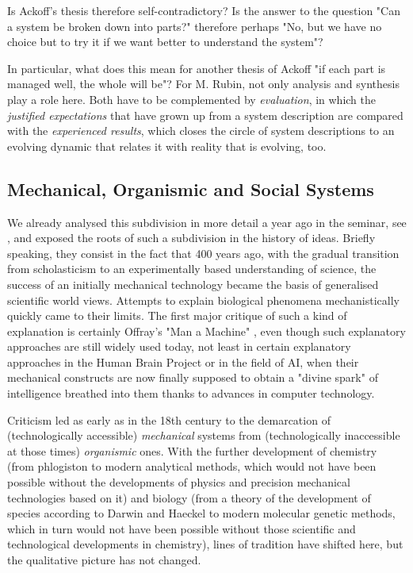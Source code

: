 \documentclass[11pt,a4paper]{article}
\begin{document}
Is Ackoff's thesis therefore self-contradictory? Is the answer to the question
"Can a system be broken down into parts?" therefore perhaps "No, but we have
no choice but to try it if we want better to understand the system"?

In particular, what does this mean for another thesis of Ackoff "if each part
is managed well, the whole will be"? For M. Rubin, not only analysis and
synthesis play a role here. Both have to be complemented by \emph{evaluation},
in which the \emph{justified expectations} that have grown up from a system
description are compared with the \emph{experienced results}, which closes the
circle of system descriptions to an evolving dynamic that relates it with
reality that is evolving, too.

\subsection{Mechanical, Organismic and Social Systems}

We already analysed this subdivision in more detail a year ago in the seminar,
see \cite{Graebe2020}, and exposed the roots of such a subdivision in the
history of ideas. Briefly speaking, they consist in the fact that 400 years
ago, with the gradual transition from scholasticism to an experimentally based
understanding of science, the success of an initially mechanical technology
became the basis of generalised scientific world views. Attempts to explain
biological phenomena mechanistically quickly came to their limits. The first
major critique of such a kind of explanation is certainly Offray's "Man a
Machine" \cite{Offray1747}, even though such explanatory approaches are still
widely used today, not least in certain explanatory approaches in the Human
Brain Project or in the field of AI, when their mechanical constructs are now
finally supposed to obtain a "divine spark" of intelligence breathed into them
thanks to advances in computer technology.

Criticism led as early as in the 18th century to the demarcation of
(technologically accessible) \emph{mechanical} systems from (technologically
inaccessible at those times) \emph{organismic} ones. With the further
development of chemistry (from phlogiston to modern analytical methods, which
would not have been possible without the developments of physics and precision
mechanical technologies based on it) and biology (from a theory of the
development of species according to Darwin and Haeckel to modern molecular
genetic methods, which in turn would not have been possible without those
scientific and technological developments in chemistry), lines of tradition
have shifted here, but the qualitative picture has not changed.
\end{document}
